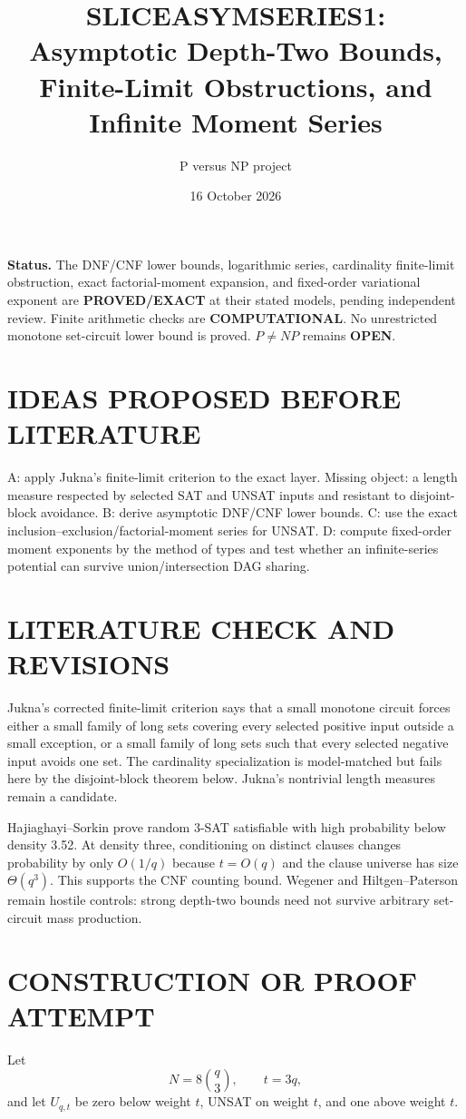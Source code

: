 \documentclass[11pt]{article}
\title{SLICEASYMSERIES1: Asymptotic Depth-Two Bounds, Finite-Limit Obstructions, and Infinite Moment Series}
\author{P versus NP project}
\date{16 October 2026}
\begin{document}
\maketitle

\noindent\textbf{Status.} The DNF/CNF lower bounds, logarithmic series, cardinality finite-limit obstruction, exact factorial-moment expansion, and fixed-order variational exponent are \textbf{PROVED/EXACT} at their stated models, pending independent review. Finite arithmetic checks are \textbf{COMPUTATIONAL}. No unrestricted monotone set-circuit lower bound is proved. $P\ne NP$ remains \textbf{OPEN}.

\section{IDEAS PROPOSED BEFORE LITERATURE}
A: apply Jukna's finite-limit criterion to the exact layer. Missing object: a length measure respected by selected SAT and UNSAT inputs and resistant to disjoint-block avoidance. B: derive asymptotic DNF/CNF lower bounds. C: use the exact inclusion--exclusion/factorial-moment series for UNSAT. D: compute fixed-order moment exponents by the method of types and test whether an infinite-series potential can survive union/intersection DAG sharing.

\section{LITERATURE CHECK AND REVISIONS}
Jukna's corrected finite-limit criterion says that a small monotone circuit forces either a small family of long sets covering every selected positive input outside a small exception, or a small family of long sets such that every selected negative input avoids one set. The cardinality specialization is model-matched but fails here by the disjoint-block theorem below. Jukna's nontrivial length measures remain a candidate.

Hajiaghayi--Sorkin prove random 3-SAT satisfiable with high probability below density 3.52. At density three, conditioning on distinct clauses changes probability by only $O(1/q)$ because $t=O(q)$ and the clause universe has size $\Theta(q^3)$. This supports the CNF counting bound. Wegener and Hiltgen--Paterson remain hostile controls: strong depth-two bounds need not survive arbitrary set-circuit mass production.

\section{CONSTRUCTION OR PROOF ATTEMPT}
Let
\[
N=8\binom q3,\qquad t=3q,
\]
and let $U_{q,t}$ be zero below weight $t$, UNSAT on weight $t$, and one above weight $t$.
\end{document}
